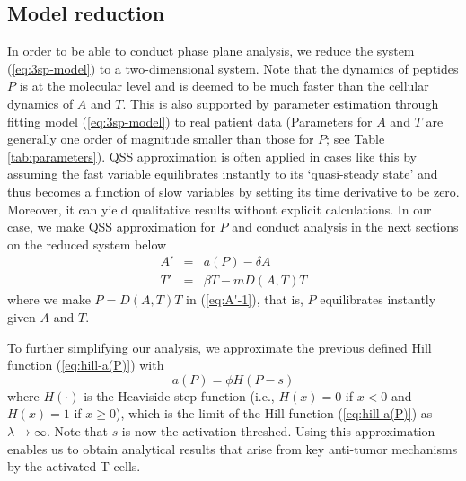 \documentclass[review,authoryear]{elsarticle}
\begin{document}
\subsection{Model reduction}
In order to be able to conduct phase plane analysis, we reduce the system (\ref{eq:3sp-model}) to a two-dimensional system. Note that the dynamics of peptides $P$ is at the molecular level and
is deemed to be much faster than the cellular dynamics of $A$ and $T$.
This is also supported by parameter estimation through fitting model (\ref{eq:3sp-model}) to real
patient data (Parameters for $A$ and $T$ are generally one order of magnitude smaller than those for $P$; see Table \ref{tab:parameters}). QSS approximation is often applied in cases like this by assuming the fast variable equilibrates instantly to its `quasi-steady state' and thus becomes a function of slow variables by setting its time derivative to be zero. Moreover, it can yield qualitative results without explicit calculations. In our case, we make QSS
approximation for $P$ and conduct analysis in the next sections on
the reduced system below
\begin{subequations} \label{eq:2sp}
\begin{eqnarray}
A' & = & a(P)-\delta A \label{eq:A'-1}\\
T' & = & \beta T-mD(A,T)T \label{eq:T'-1}
\end{eqnarray}
\end{subequations}
where we make $P=D(A,T)T$ in (\ref{eq:A'-1}), that is, $P$ equilibrates instantly given $A$ and $T$. 


To further simplifying our analysis, we approximate the previous defined Hill function (\ref{eq:hill-a(P)}) with 
\begin{equation} \label{eq:heaviside}
a(P)=\phi H(P-s)
\end{equation}
where $H(\cdot)$ is the Heaviside step function (i.e., $H(x)=0$ if $x<0$
and $H(x)=1$ if $x\ge0$), which is the limit of the Hill
function (\ref{eq:hill-a(P)}) as $\lambda\to\infty$. Note that $s$ is now the activation threshed. Using this approximation enables us to obtain analytical results that arise from
key anti-tumor mechanisms by the activated T cells. 
\end{document}
